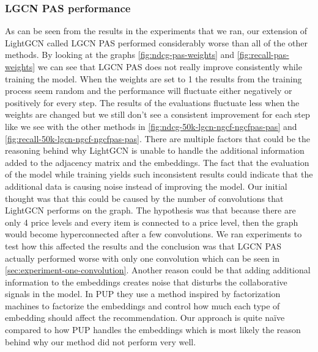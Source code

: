 \subsubsection{LGCN PAS performance}
As can be seen from the results in the experiments that we ran, our extension of LightGCN called LGCN PAS performed considerably worse than all of the other methods.
By looking at the graphs \autoref{fig:ndcg-pas-weights} and \autoref{fig:recall-pas-weights} we can see that LGCN PAS does not really improve consistently while training the model.
When the weights are set to 1 the results from the training process seem random and the performance will fluctuate either negatively or positively for every step.
The results of the evaluations fluctuate less when the weights are changed but we still don't see a consistent improvement for each step like we see with the other methods in \autoref{fig:ndcg-50k-lgcn-ngcf-ngcfpas-pas} and \autoref{fig:recall-50k-lgcn-ngcf-ngcfpas-pas}.
There are multiple factors that could be the reasoning behind why LightGCN is unable to handle the additional information added to the adjacency matrix and the embeddings.
The fact that the evaluation of the model while training yields such inconsistent results could indicate that the additional data is causing noise instead of improving the model. 
Our initial thought was that this could be caused by the number of convolutions that LightGCN performs on the graph.
The hypothesis was that because there are only 4 price levels and every item is connected to a price level, then the graph would become hyperconnected after a few convolutions.
We ran experiments to test how this affected the results and the conclusion was that LGCN PAS actually performed worse with only one convolution which can be seen in \autoref{sec:experiment-one-convolution}.
Another reason could be that adding additional information to the embeddings creates noise that disturbs the collaborative signals in the model.
In PUP they use a method inspired by factorization machines to factorize the embeddings and control how much each type of embedding should affect the recommendation.
Our approach is quite naïve compared to how PUP handles the embeddings which is most likely the reason behind why our method did not perform very well.
